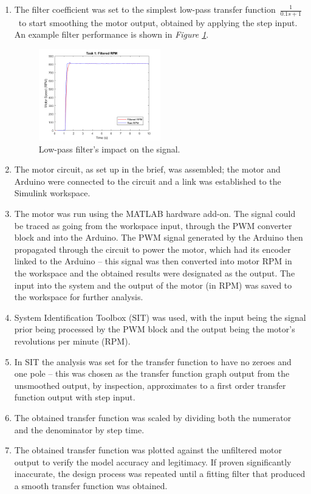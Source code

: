 \documentclass[11pt, onecolumn]{article}
\begin{document}
\begin{enumerate}
    \item The filter coefficient was set to the simplest low-pass transfer function $\frac{1}{0.1s+1}$ to start smoothing the motor output, obtained by applying the step input. An example filter performance is shown in \textit{Figure \ref{fig:q1-filter}}.
          \begin{figure}[h!]
              \centering
              \includegraphics[width=0.5\textwidth]{q1-filter.png}
              \caption{Low-pass filter's impact on the signal.}
              \label{fig:q1-filter}
          \end{figure}
    \item The motor circuit, as set up in the brief, was assembled; the motor and Arduino were connected to the circuit and a link was established to the Simulink workspace.
    \item The motor was run using the MATLAB hardware add-on. The signal could be traced as going from the workspace input, through the PWM converter block and into the Arduino. The PWM signal generated by the Arduino then propagated through the circuit to power the motor, which had its encoder linked to the Arduino – this signal was then converted into motor RPM in the workspace and the obtained results were designated as the output. The input into the system and the output of the motor (in RPM) was saved to the workspace for further analysis.
    \item System Identification Toolbox (SIT) was used, with the input being the signal prior being processed by the PWM block and the output being the motor's revolutions per minute (RPM).
    \item In SIT the analysis was set for the transfer function to have no zeroes and one pole – this was chosen as the transfer function graph output from the unsmoothed output, by inspection, approximates to a first order transfer function output with step input.
    \item The obtained transfer function was scaled by dividing both the numerator and the denominator by step time.
    \item The obtained transfer function was plotted against the unfiltered motor output to verify the model accuracy and legitimacy. If proven significantly inaccurate, the design process was repeated until a fitting filter that produced a smooth transfer function was obtained.
\end{enumerate}
\end{document}
